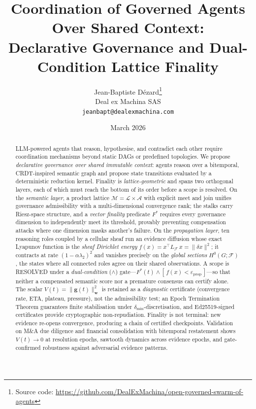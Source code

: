 \documentclass[11pt]{article}
\title{Coordination of Governed Agents Over Shared Context:\\Declarative Governance and Dual-Condition Lattice Finality}
\author{
  Jean-Baptiste D\'ezard\thanks{Source code: \url{https://github.com/DealExMachina/open-governed-swarm-of-agents}}\\
  Deal ex Machina SAS\\
  \texttt{jeanbapt@dealexmachina.com}
}
\date{March 2026}
\begin{document}
\setlength{\emergencystretch}{2em}
\sloppy

\maketitle

\begin{abstract}
LLM-powered agents that reason, hypothesise, and contradict each other require coordination mechanisms beyond static DAGs or predefined topologies.
We propose \emph{declarative governance over shared immutable context}: agents reason over a bitemporal, CRDT-inspired semantic graph and propose state transitions evaluated by a deterministic reduction kernel.
Finality is \emph{lattice-geometric} and spans two orthogonal layers, each of which must reach the bottom of its order before a scope is resolved.
On the \emph{semantic layer}, a product lattice $\mathcal{M} = \mathcal{L} \times \mathcal{A}$ with explicit meet and join unifies governance admissibility with a multi-dimensional convergence rank; the stalks carry Riesz-space structure, and a \emph{vector finality} predicate $F^*$ requires every governance dimension to independently meet its threshold, provably preventing compensation attacks where one dimension masks another's failure.
On the \emph{propagation layer}, ten reasoning roles coupled by a cellular sheaf run an evidence diffusion whose exact Lyapunov function is the \emph{sheaf Dirichlet energy} $f(x) = x^\top L_{\mathcal{F}}\, x = \|\delta x\|^2$; it contracts at rate $(1-\alpha\lambda_2)^2$ and vanishes precisely on the \emph{global sections} $H^0(G;\mathcal{F})$, the states where all connected roles agree on their shared observations.
A scope is RESOLVED under a \emph{dual-condition} ($\wedge$) gate---$F^*(t) \wedge [\,f(x) < \varepsilon_{\mathrm{prop}}\,]$---so that neither a compensated semantic score nor a premature consensus can certify alone.
The scalar $V(t) = \|\mathbf{g}(t)\|^2_\mathbf{w}$ is retained as a \emph{diagnostic} certificate (convergence rate, ETA, plateau, pressure), not the admissibility test; an Epoch Termination Theorem guarantees finite stabilisation under $\delta_{\min}$-discretisation, and Ed25519-signed certificates provide cryptographic non-repudiation.
Finality is not terminal: new evidence re-opens convergence, producing a chain of certified checkpoints.
Validation on M\&A due diligence and financial consolidation with bitemporal restatement shows $V(t) \to 0$ at resolution epochs, sawtooth dynamics across evidence epochs, and gate-confirmed robustness against adversarial evidence patterns.
\end{abstract}
\end{document}
